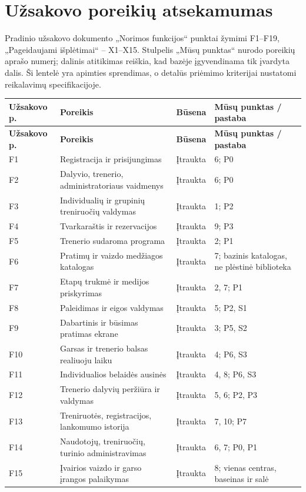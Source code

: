 \section{Užsakovo poreikių atsekamumas}\label{sec:atsekamumas}
Pradinio užsakovo dokumento „Norimos funkcijos“ punktai žymimi F1--F19, „Pageidaujami išplėtimai“ -- X1--X15. Stulpelis „Mūsų punktas“ nurodo poreikių aprašo numerį; dalinis atitikimas reiškia, kad bazėje įgyvendinama tik įvardyta dalis. Ši lentelė yra apimties sprendimas, o detalūs priėmimo kriterijai nustatomi reikalavimų specifikacijoje.
\small
\begin{longtable}{@{}p{1.15cm}p{6.15cm}p{2.75cm}p{4cm}@{}}
\toprule
\textbf{Užsakovo p.} & \textbf{Poreikis} & \textbf{Būsena} & \textbf{Mūsų punktas / pastaba} \\
\midrule\endfirsthead
\toprule\textbf{Užsakovo p.} & \textbf{Poreikis} & \textbf{Būsena} & \textbf{Mūsų punktas / pastaba} \\
\midrule\endhead
F1 & Registracija ir prisijungimas & Įtraukta & 6; P0 \\
F2 & Dalyvio, trenerio, administratoriaus vaidmenys & Įtraukta & 6; P0 \\
F3 & Individualių ir grupinių treniruočių valdymas & Įtraukta & 1; P2 \\
F4 & Tvarkaraštis ir rezervacijos & Įtraukta & 9; P3 \\
F5 & Trenerio sudaroma programa & Įtraukta & 2; P1 \\
F6 & Pratimų ir vaizdo medžiagos katalogas & Įtraukta & 7; bazinis katalogas, ne plėstinė biblioteka \\
F7 & Etapų trukmė ir medijos priskyrimas & Įtraukta & 2, 7; P1 \\
F8 & Paleidimas ir eigos valdymas & Įtraukta & 5; P2, S1 \\
F9 & Dabartinis ir būsimas pratimas ekrane & Įtraukta & 3; P5, S2 \\
F10 & Garsas ir trenerio balsas realiuoju laiku & Įtraukta & 4; P6, S3 \\
F11 & Individualios belaidės ausinės & Įtraukta & 4, 8; P6, S3 \\
F12 & Trenerio dalyvių peržiūra ir valdymas & Įtraukta & 5, 6; P2, P3 \\
F13 & Treniruotės, registracijos, lankomumo istorija & Įtraukta & 7, 10; P7 \\
F14 & Naudotojų, treniruočių, turinio administravimas & Įtraukta & 6, 7; P0, P1 \\
F15 & Įvairios vaizdo ir garso įrangos palaikymas & Įtraukta & 8; vienas centras, baseinas ir salė \\

\end{longtable}
